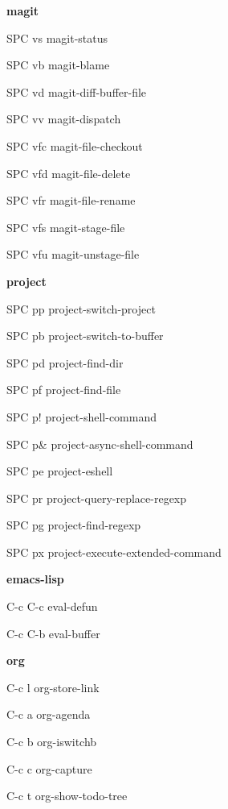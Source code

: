 \documentclass[10pt]{article}
\renewcommand\subsection[1]{\smallskip\par\textbf{\color{heading}#1}}
\begin{document}
\begin{multicols}{3}
  \subsection{magit}
  \begin{keylist}
  \item[SPC vs] magit-status
  \item[SPC vb] magit-blame
  \item[SPC vd] magit-diff-buffer-file
  \item[SPC vv] magit-dispatch
  \item[SPC vfc] magit-file-checkout
  \item[SPC vfd] magit-file-delete
  \item[SPC vfr] magit-file-rename
  \item[SPC vfs] magit-stage-file
  \item[SPC vfu] magit-unstage-file
  \end{keylist}

  \subsection{project}
  \begin{keylist}
  \item[SPC pp] project-switch-project
  \item[SPC pb] project-switch-to-buffer
  \item[SPC pd] project-find-dir
  \item[SPC pf] project-find-file
  \item[SPC p!] project-shell-command
  \item[SPC p\&] project-async-shell-command
  \item[SPC pe] project-eshell
  \item[SPC pr] project-query-replace-regexp
  \item[SPC pg] project-find-regexp
  \item[SPC px] project-execute-extended-command
  \end{keylist}

  \subsection{emacs-lisp}
  \begin{keylist}
  \item[C-c C-c] eval-defun
  \item[C-c C-b] eval-buffer
  \end{keylist}

  \subsection{org}
  \begin{keylist}
  \item[C-c l] org-store-link
  \item[C-c a] org-agenda
  \item[C-c b] org-iswitchb
  \item[C-c c] org-capture
  \item[C-c t] org-show-todo-tree
  \end{keylist}

\end{multicols}
\end{document}
